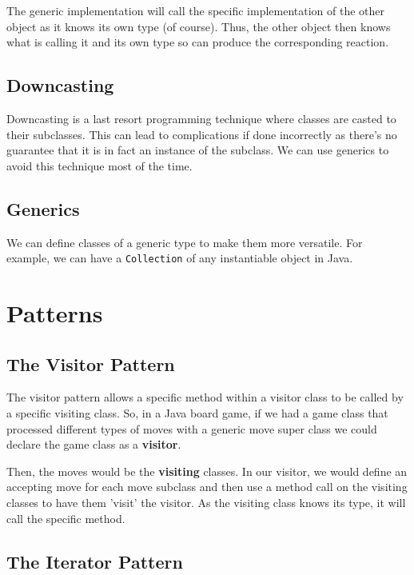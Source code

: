 \documentclass[a4paper, 12pt, twoside]{article}
\begin{document}
\vspace{\baselineskip}

The generic implementation will call the specific implementation of
the other object as it knows its own type (of course). Thus,
the other object then knows what is calling it and its own type
so can produce the corresponding reaction.

\subsection{Downcasting}

Downcasting is a last resort programming technique where classes
are casted to their subclasses. This can lead to complications if
done incorrectly as there's no guarantee that it is in fact
an instance of the subclass. We can use generics to avoid this
technique most of the time.

\subsection{Generics}

We can define classes of a generic type to make them more versatile.
For example, we can have a \texttt{Collection} of any instantiable
object in Java.

\section{Patterns}

\subsection{The Visitor Pattern}

The visitor pattern allows a specific method within a visitor class
to be called by a specific visiting class. So, in a Java board game, 
if we had a game class that processed different types of moves
with a generic move super class we could declare the game class
as a \textbf{visitor}.

\vspace{\baselineskip}

Then, the moves would be the \textbf{visiting} classes. In our
visitor, we would define an accepting move for each move subclass
and then use a method call on the visiting classes to have them
'visit' the visitor. As the visiting class knows its type, it will
call the specific method.

\subsection{The Iterator Pattern}
\end{document}
